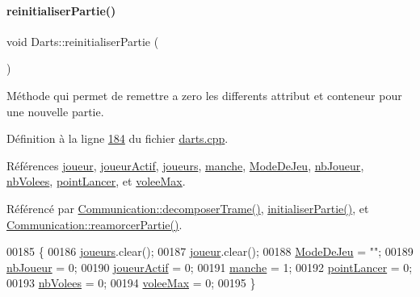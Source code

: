 \paragraph{\texorpdfstring{reinitialiser\+Partie()}{reinitialiserPartie()}}
{\footnotesize\ttfamily void Darts\+::reinitialiser\+Partie (\begin{DoxyParamCaption}{ }\end{DoxyParamCaption})}



Méthode qui permet de remettre a zero les differents attribut et conteneur pour une nouvelle partie. 



Définition à la ligne \hyperlink{darts_8cpp_source_l00184}{184} du fichier \hyperlink{darts_8cpp_source}{darts.\+cpp}.



Références \hyperlink{darts_8h_source_l00074}{joueur}, \hyperlink{darts_8h_source_l00076}{joueur\+Actif}, \hyperlink{darts_8h_source_l00073}{joueurs}, \hyperlink{darts_8h_source_l00077}{manche}, \hyperlink{darts_8h_source_l00081}{Mode\+De\+Jeu}, \hyperlink{darts_8h_source_l00075}{nb\+Joueur}, \hyperlink{darts_8h_source_l00080}{nb\+Volees}, \hyperlink{darts_8h_source_l00078}{point\+Lancer}, et \hyperlink{darts_8h_source_l00079}{volee\+Max}.



Référencé par \hyperlink{communication_8cpp_source_l00188}{Communication\+::decomposer\+Trame()}, \hyperlink{darts_8cpp_source_l00144}{initialiser\+Partie()}, et \hyperlink{communication_8cpp_source_l00305}{Communication\+::reamorcer\+Partie()}.


\begin{DoxyCode}
00185 \{
00186     \hyperlink{class_darts_a81bc116f3ae70cea1f492f87f01901c7}{joueurs}.clear();
00187     \hyperlink{class_darts_a97cc62d823c3d41604bb4a2d329ddfea}{joueur}.clear();
00188     \hyperlink{class_darts_a281fd6201343dfb65ab81c93fd60f786}{ModeDeJeu} = \textcolor{stringliteral}{""};
00189     \hyperlink{class_darts_ac5ae0e3546d00f59adba76c4ece71725}{nbJoueur} = 0;
00190     \hyperlink{class_darts_a68fb01b9aad6502e4429dfbf2a72d50b}{joueurActif} = 0;
00191     \hyperlink{class_darts_ac7b7bd23e64b4fab3895f02f085ea85f}{manche} = 1;
00192     \hyperlink{class_darts_a7ed0e6c9c07930603f85c2bac5b9d78b}{pointLancer} = 0;
00193     \hyperlink{class_darts_ae73a0b876ca354c7abd0d39db15c94fa}{nbVolees} = 0;
00194     \hyperlink{class_darts_aed9c6aa8f34fb2dcbc57a5ea24aa6c2a}{voleeMax} = 0;
00195 \}
\end{DoxyCode}
\mbox{\label{class_darts_ab038eac80e5fc5e8abbab5682e87f8f2}} 
